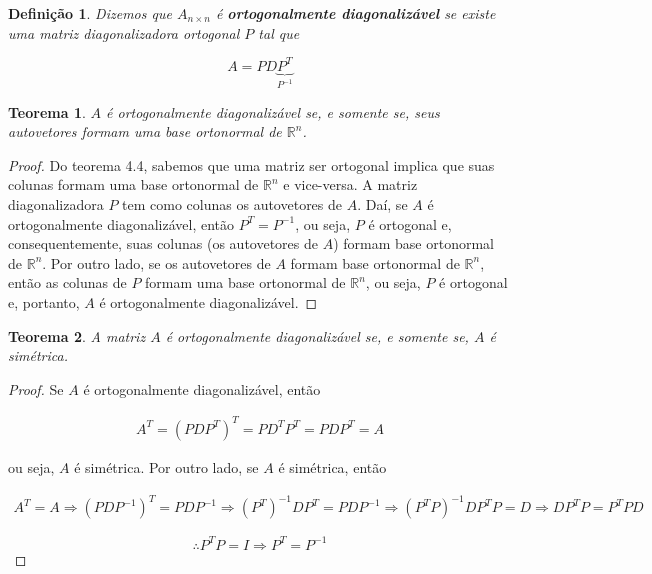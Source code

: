 \documentclass{article}
\newtheorem{theorem}{Teorema}[section]
\newtheorem*{definition}{Definição}
\begin{document}
\begin{definition}
	Dizemos que $A_{n\times n}$ é \textbf{ortogonalmente diagonalizável} se existe uma matriz diagonalizadora ortogonal $P$ tal que
	
	\begin{equation*}
	A = PD\underbrace{P^T}_{P^{-1}}
	\end{equation*} 
	
\end{definition}

\begin{theorem}
	$A$ é ortogonalmente diagonalizável se, e somente se, seus autovetores formam uma base ortonormal de $\mathbb{R}^n$.
\end{theorem}

\begin{proof}
	Do teorema 4.4, sabemos que uma matriz ser ortogonal implica que suas colunas formam uma base ortonormal de $\mathbb{R}^n$ e vice-versa. A matriz diagonalizadora $P$ tem como colunas os autovetores de $A$. Daí, se $A$ é ortogonalmente diagonalizável, então $P^T = P^{-1}$, ou seja, $P$ é ortogonal e, consequentemente, suas colunas (os autovetores de $A$) formam base ortonormal de $\mathbb{R}^n$. Por outro lado, se os autovetores de $A$ formam base ortonormal de $\mathbb{R}^n$, então as colunas de $P$ formam uma base ortonormal de $\mathbb{R}^n$, ou seja, $P$ é ortogonal e, portanto, $A$ é ortogonalmente diagonalizável.
\end{proof}

\begin{theorem}
	A matriz $A$ é ortogonalmente diagonalizável se, e somente se, $A$ é simétrica.
\end{theorem}

\begin{proof}
	Se $A$ é ortogonalmente diagonalizável, então
	
	\begin{align*}
	A^T = (PDP^T)^T = PD^TP^T = PDP^T = A
	\end{align*}
	
	\par\vspace{0.3cm} ou seja, $A$ é simétrica. Por outro lado, se $A$ é simétrica, então
	
	\begin{align*}
	A^T = A \Rightarrow (PDP^{-1})^T = PDP^{-1} \Rightarrow (P^T)^{-1}DP^T = PDP^{-1} \Rightarrow (P^TP)^{-1}DP^TP = D \Rightarrow DP^TP = P^TPD 
	\end{align*}
	
	\begin{equation*}
	\therefore P^TP = I \Rightarrow P^T = P^{-1}
	\end{equation*}
	
\end{proof}
\end{document}
